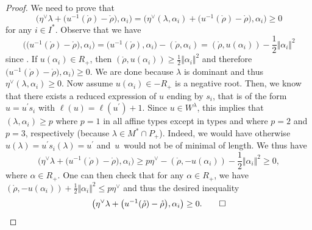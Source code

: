 \documentclass[10pt,a4paper]{article}
\numberwithin{equation}{section}
\providecommand{\qed}{\ensuremath{\square}}
\begin{document}
\begin{proof}
	We need to prove that
	\[
	\bigl(\eta^{\vee}\lambda+\bigl(u^{-1}(\mathring{\rho})-\mathring{\rho}\bigr),\alpha_{i}%
	\bigr)=\bigl(\eta^{\vee}(\lambda,\alpha_{i})+\bigl(u^{-1}(\mathring{\rho})-\mathring{\rho
	}\bigr), \alpha_{i}\bigr)\geq0
	\]
	for any $i\in I^{\ast}$. Observe that we have
	\[
	\bigl(\bigl(u^{-1}(\mathring{\rho})-\mathring{\rho}\bigr), \alpha_{i}\bigr) =\bigl(u^{-1}(\mathring{\rho
	}),\alpha_{i}\bigr)-(\mathring{\rho},\alpha_{i})=(\mathring{\rho},u(\alpha
	_{i}))-\frac{1}{2} \Vert \alpha_{i} \Vert ^{2}
	\]
	since . If $u(\alpha_{i})\in R_{+}$, then $(\mathring{\rho
	},u(\alpha_{i}))\geq\frac{1}{2} \Vert \alpha_{i} \Vert ^{2}$ and
	therefore $\bigl(u^{-1}(\mathring{\rho})-\mathring{\rho}\bigr),\alpha_{i})\geq0$. We are
	done because $\lambda$ is dominant and thus $\eta^{\vee}(\lambda,\alpha
	_{i})\geq0$. Now assume $u(\alpha_{i})\in-R_{+}$ is a negative root. Then, we
	know that there exists a reduced expression of $u$ ending by $s_{i}$, that is
	of the form $u=u^{\prime}s_{i}$ with $\ell(u)=\ell(u^{\prime})+1$. Since $u\in
	W^{\lambda}$, this implies that $(\lambda,\alpha_{i})\geq p$ where $p=1$ in
	all affine types except in types  and  where $p=2$
	and $p=3$, respectively (because $\lambda\in M^{\ast}\cap P_{+}$). Indeed, we
	would have otherwise $u(\lambda)=u^{\prime}s_{i}(\lambda)=u^{\prime}$ and~$u$~would
    not be of minimal of length. We thus have
	\[
	\bigl(\eta^{\vee}\lambda+\bigl(u^{-1}(\mathring{\rho})-\mathring{\rho}\bigr),\alpha_{i}\bigr)\geq
	p\eta^{\vee}-(\mathring{\rho},-u(\alpha_{i}))-\frac{1}{2} \Vert \alpha
	_{i} \Vert ^{2}\geq0,
	\]
	where $\alpha\in R_{+}$. One can then check that for any $\alpha\in R_{+}$,
	we have $(\mathring{\rho},-u(\alpha_{i}))+\frac{1}{2} \Vert \alpha
	_{i} \Vert ^{2}\leq p\eta^{\vee}$ and thus the desired inequality
	\[
	\bigl(\eta^{\vee}\lambda+\bigl(u^{-1}(\mathring{\rho})-\mathring{\rho}\bigr),\alpha_{i}%
	\bigr)\geq0.\qedhere
\tag*{\qed}
\]
\renewcommand{\qed}{}
\end{proof}
\end{document}
